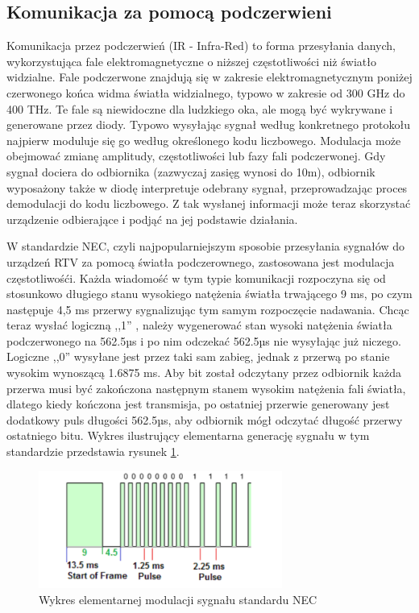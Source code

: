 \documentclass[12pt,twoside]{article}
\begin{document}
\subsection{Komunikacja za pomocą podczerwieni}
Komunikacja przez podczerwień\cite{infrared} (IR - Infra-Red) to forma przesyłania danych, wykorzystująca fale elektromagnetyczne
o niższej częstotliwości niż światło widzialne. Fale podczerwone znajdują się w zakresie elektromagnetycznym
poniżej czerwonego końca widma światła widzialnego, typowo w zakresie od 300 GHz do 400 THz. Te fale są
niewidoczne dla ludzkiego oka, ale mogą być wykrywane i generowane przez diody. Typowo
wysyłając sygnał według konkretnego protokołu najpierw moduluje się go według określonego kodu liczbowego.
Modulacja może obejmować zmianę amplitudy, częstotliwości lub fazy fali podczerwonej. Gdy sygnał dociera do odbiornika
(zazwyczaj zasięg wynosi do 10m), odbiornik wyposażony także w diodę interpretuje odebrany sygnał, przeprowadzając proces demodulacji do kodu
liczbowego. Z tak wysłanej informacji może teraz skorzystać urządzenie odbierające i podjąć na jej podstawie działania.

W standardzie NEC\cite{necIR}, czyli najpopularniejszym sposobie przesyłania sygnałów do urządzeń RTV za pomocą światła podczerownego, zastosowana jest modulacja częstotliwośći. Każda wiadomość w tym typie komunikacji rozpoczyna się od stosunkowo długiego stanu wysokiego natężenia światła trwającego 9 ms, po czym następuje 4,5 ms przerwy sygnalizując tym samym rozpoczęcie nadawania. Chcąc teraz wysłać logiczną ,,1'' , należy wygenerować stan wysoki natężenia światła podczerwonego na 562.5µs i po nim odczekać 562.5µs nie wysyłając już niczego. Logiczne ,,0'' wysyłane jest przez taki sam zabieg, jednak z przerwą po stanie wysokim wynoszącą 1.6875 ms. Aby bit został odczytany przez odbiornik każda przerwa musi być zakończona następnym stanem wysokim natężenia fali światła, dlatego kiedy kończona jest transmisja, po ostatniej przerwie generowany jest dodatkowy puls długości 562.5µs, aby odbiornik mógł odczytać długość przerwy ostatniego bitu. Wykres ilustrujący elementarna generację sygnału w tym standardzie przedstawia rysunek \ref*{Fig:necOnesZerosFigure}.
\begin{figure}[ht]
   \centering
   \includegraphics[width=8cm]{images/necOnesAndZeros.png}
   \caption{Wykres elementarnej modulacji sygnału standardu NEC}
   \label{Fig:necOnesZerosFigure}
\end{figure}
\end{document}
